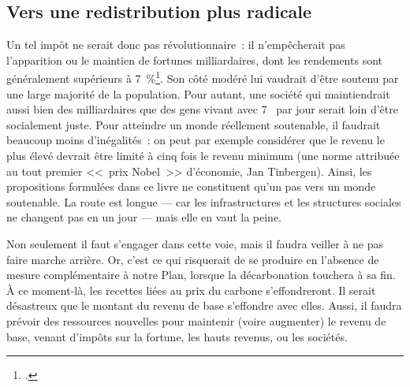\documentclass[a5paper,french,openany]{memoir}
\begin{document}
\subsection{Vers une redistribution plus radicale}
Un tel impôt ne serait donc pas révolutionnaire~: il n'empêcherait pas l'apparition ou le maintien de fortunes milliardaires, dont les rendements sont généralement supérieurs à 7~\%\footnote{\cite{chancel_world_2022}.}. 
Son côté modéré lui vaudrait d'être soutenu par une large majorité de la population. Pour autant, une société qui maintiendrait aussi bien des milliardaires que des gens vivant avec 7~\textit{\texteuro{}} par jour serait loin d'être socialement juste. Pour atteindre un monde réellement soutenable, il faudrait beaucoup moins d'inégalités~: %
on peut par exemple considérer que le revenu le plus élevé devrait être limité à cinq fois le revenu minimum (une norme attribuée au tout premier <<~prix Nobel~>> d'économie, Jan Tinbergen). Ainsi, les propositions formulées dans ce livre ne constituent qu'un pas vers un monde soutenable. La route est longue --- car les infrastructures et les structures sociales ne changent pas en un jour --- mais elle en vaut la peine.  

Non seulement il faut s'engager dans cette voie, mais il faudra veiller à ne pas faire marche arrière. Or, c'est ce qui risquerait de se produire en l'absence de mesure complémentaire à notre Plan, lorsque la décarbonation touchera à sa fin. %
À ce moment-là, les recettes liées au prix du carbone s'effondreront. Il serait désastreux que le montant du revenu de base s'effondre avec elles. Aussi, il faudra prévoir des ressources nouvelles pour maintenir (voire augmenter) le revenu de base, 
venant d'impôts sur la fortune, les hauts revenus, ou les sociétés. 
\end{document}

